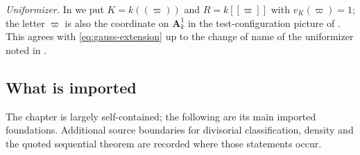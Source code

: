 \emph{Uniformizer.}  In  we put $K=k(\!(\varpi)\!)$
and $R=k[\![\varpi]\!]$ with $v_K(\varpi)=1$; the letter $\varpi$ is
also the coordinate on $\mathbf A^1_k$ in the test-configuration picture of
.  This agrees with
\eqref{eq:gauss-extension} up to the change of name of the uniformizer noted
in .

\subsection{What is imported}
\label{sec:ch32-imported}

The chapter is largely self-contained; the following are its main imported foundations.  Additional source
boundaries for divisorial classification, density and the quoted
sequential theorem are recorded where those statements occur.


